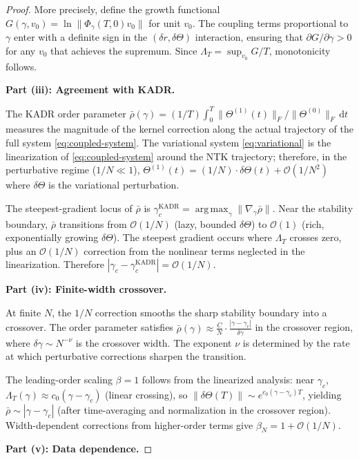 \documentclass[11pt]{article}
\theoremstyle{definition}
\newcommand{\argmax}{\mathop{\mathrm{arg\,max}}}
\newcommand{\cO}{\mathcal{O}}
\newcommand{\norm}[1]{\lVert #1 \rVert}
\newcommand{\dd}{\mathrm{d}}
\newcommand{\pp}{\partial}
\renewcommand{\Theta}{\varTheta}
\begin{document}
\begin{proof}
More precisely, define the growth functional $G(\gamma, v_0) = \ln\norm{\Phi_\gamma(T,0)v_0}$ for unit $v_0$. The coupling terms proportional to $\gamma$ enter with a definite sign in the $(\delta r, \delta\Theta)$ interaction, ensuring that $\pp G/\pp\gamma > 0$ for any $v_0$ that achieves the supremum. Since $\Lambda_T = \sup_{v_0} G/T$, monotonicity follows.

\textbf{Part (iii): Agreement with KADR.}

The KADR order parameter $\bar{\rho}(\gamma) = (1/T)\int_0^T \norm{\Theta^{(1)}(t)}_F/\norm{\Theta^{(0)}}_F\,\dd t$ measures the magnitude of the kernel correction along the actual trajectory of the full system \eqref{eq:coupled-system}. The variational system \eqref{eq:variational} is the linearization of \eqref{eq:coupled-system} around the NTK trajectory; therefore, in the perturbative regime ($1/N \ll 1$), $\Theta^{(1)}(t) = (1/N) \cdot \delta\Theta(t) + \cO(1/N^2)$ where $\delta\Theta$ is the variational perturbation.

The steepest-gradient locus of $\bar{\rho}$ is $\gamma_c^{\mathrm{KADR}} = \argmax_\gamma \norm{\nabla_\gamma \bar{\rho}}$. Near the stability boundary, $\bar{\rho}$ transitions from $\cO(1/N)$ (lazy, bounded $\delta\Theta$) to $\cO(1)$ (rich, exponentially growing $\delta\Theta$). The steepest gradient occurs where $\Lambda_T$ crosses zero, plus an $\cO(1/N)$ correction from the nonlinear terms neglected in the linearization. Therefore $|\gamma_c - \gamma_c^{\mathrm{KADR}}| = \cO(1/N)$.

\textbf{Part (iv): Finite-width crossover.}

At finite $N$, the $1/N$ correction smooths the sharp stability boundary into a crossover. The order parameter satisfies $\bar{\rho}(\gamma) \approx \frac{C}{N} \cdot \frac{|\gamma - \gamma_c|}{\delta\gamma}$ in the crossover region, where $\delta\gamma \sim N^{-\nu}$ is the crossover width. The exponent $\nu$ is determined by the rate at which perturbative corrections sharpen the transition.

The leading-order scaling $\beta = 1$ follows from the linearized analysis: near $\gamma_c$, $\Lambda_T(\gamma) \approx c_0(\gamma - \gamma_c)$ (linear crossing), so $\norm{\delta\Theta(T)} \sim e^{c_0(\gamma - \gamma_c)T}$, yielding $\bar{\rho} \sim |\gamma - \gamma_c|$ (after time-averaging and normalization in the crossover region). Width-dependent corrections from higher-order terms give $\beta_N = 1 + \cO(1/N)$.

\textbf{Part (v): Data dependence.}


\end{proof}
\end{document}
